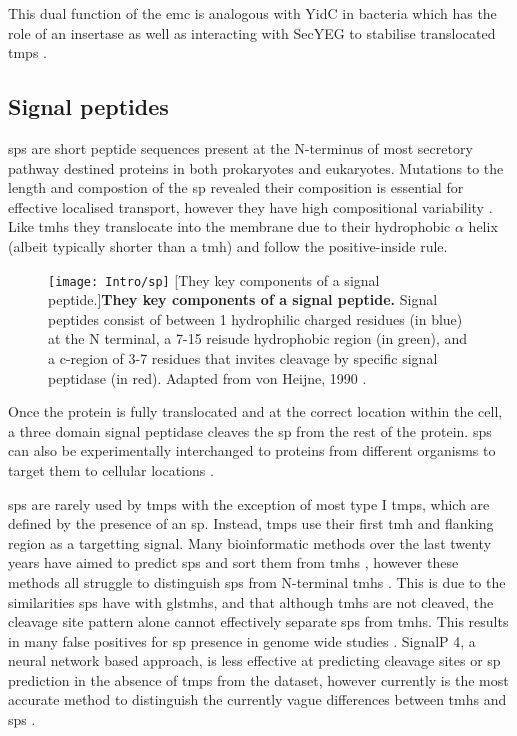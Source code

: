 This dual function of the \gls{emc} is analogous with YidC \cite{Shurtleff2018} in bacteria which has the role of an insertase \cite{Samuelson2000, Drew2003, Dalby2014} as well as interacting with SecYEG to stabilise translocated \gls{tmp}s \cite{Nagamori2004}.

\subsection{Signal peptides}
\gls{sp}s are short peptide sequences present at the N-terminus of most secretory pathway destined proteins in both prokaryotes and eukaryotes.
Mutations to the length and compostion of the \gls{sp} revealed their composition is essential for effective localised transport, however they have high compositional variability \cite{VonHeijne1985}.
Like \gls{tmh}s they translocate into the membrane due to their hydrophobic $\alpha$ helix (albeit typically shorter than a \gls{tmh}) and follow the positive\--inside rule.

\begin{figure}[ht]
\centering
\texttt{[image: Intro/sp]}
		[They key components of a signal peptide.]{\textbf{They key components of a signal peptide.}
		Signal peptides consist of between 1 hydrophilic charged residues (in blue) at the N terminal, a 7-15 reisude hydrophobic region (in green), and a c-region of 3-7 residues that invites cleavage by specific signal peptidase (in red).
	Adapted from von Heijne, 1990 \cite{VonHeijne1990}.
		}
\label{fig:sp}
\end{figure}


Once the protein is fully translocated and at the correct location within the cell, a three domain signal peptidase cleaves the \gls{sp} from the rest of the protein.
\gls{sp}s can also be experimentally interchanged to proteins from different organisms to target them to cellular locations \cite{Izard1994, Gierasch1989}.

\gls{sp}s are rarely used by \gls{tmp}s with the exception of most type I \gls{tmp}s, which are defined by the presence of an \gls{sp}.
Instead, \gls{tmp}s use their first \gls{tmh} and flanking region as a targetting signal.
Many bioinformatic methods over the last twenty years have aimed to predict \gls{sp}s and sort them from \gls{tmh}s \cite{Choo2009}, however these methods all struggle to distinguish \gls{sp}s from N-terminal \gls{tmh}s \cite{Petersen2011}.
This is due to the similarities \gls{sp}s have with gls{tmh}s, and that although \gls{tmh}s are not cleaved, the cleavage site pattern alone cannot effectively separate \gls{sp}s from \gls{tmh}s.
This results in many false positives for \gls{sp} presence in genome wide studies \cite{Petersen2011}.
SignalP 4, a neural network based approach, is less effective at predicting cleavage sites or \gls{sp} prediction in the absence of \gls{tmp}s from the dataset, however currently is the most accurate method to distinguish the currently vague differences between \gls{tmh}s and \gls{sp}s \cite{Petersen2011}.


